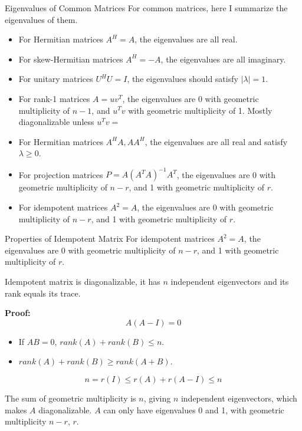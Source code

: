 \documentclass{beamer}
\begin{document}
\begin{frame}{Eigenvalues of Common Matrices}
For common matrices, here I summarize the eigenvalues of them.
\begin{itemize}
    \item For Hermitian matrices $A^H=A$, the eigenvalues are all real.
    \item For skew-Hermitian matrices $A^H=-A$, the eigenvalues are all imaginary.
    \item For unitary matrices $U^HU=I$, the eigenvalues should satisfy $|\lambda|=1$.
    \item For rank-1 matrices $A=uv^T$, the eigenvalues are 0 with geometric multiplicity of $n-1$, and $u^Tv$ with geometric multiplicity of 1. Mostly diagonalizable unless $u^Tv=$
    \item For Hermitian matrices $A^HA, AA^H$, the eigenvalues are all real and satisfy $\lambda \geq 0$.
    \item For projection matrices $P=A(A^TA)^{-1}A^T$, the eigenvalues are 0 with geometric multiplicity of $n-r$, and 1 with geometric multiplicity of $r$.
    \item For idempotent matrices $A^2=A$, the eigenvalues are 0 with geometric multiplicity of $n-r$, and 1 with geometric multiplicity of $r$.
\end{itemize}
\end{frame}

\begin{frame}{Properties of Idempotent Matrix}
For idempotent matrices $A^2=A$, the eigenvalues are 0 with geometric multiplicity of $n-r$, and 1 with geometric multiplicity of $r$.

\vspace{3pt}
Idempotent matrix is diagonalizable, it has $n$ independent eigenvectors and its rank equals its trace.

\vspace{5pt}

\textbf{Proof:}
\begin{equation*}
    A\left( A-I \right) =0
\end{equation*}

\begin{itemize}
    \item If $AB=0$, $rank(A)+rank(B)\leq n$.
    \item $rank(A)+rank(B)\geq  rank(A+B)$.
\end{itemize}

\begin{equation*}
    n=r\left( I \right) \leqslant r\left( A \right) +r\left( A-I \right) \leqslant n
\end{equation*}

The sum of geometric multiplicity is $n$, giving $n$ independent eigenvectors, which makes $A$ diagonalizable. $A$ can only have eigenvalues 0 and 1, with geometric multiplicity $n-r$, $r$.
\end{frame}
\end{document}
